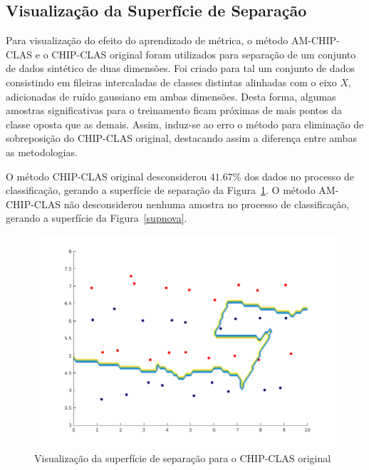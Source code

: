 \documentclass[
	12pt,				%
	openright,			%
	twoside,			%
	a4paper,			%
	english,			%
	spanish,			%
	brazil,				%
	]{abntex2}\usepackage[]{graphicx}\usepackage[]{color}
\begin{document}
\subsection{Visualização da Superfície de Separação}

Para visualização do efeito do aprendizado de métrica, o método AM-CHIP-CLAS e o CHIP-CLAS original foram utilizados para separação de um conjunto de dados sintético de duas dimensões. Foi criado para tal um conjunto de dados consistindo em fileiras intercaladas de classes distintas alinhadas com o eixo $X$, adicionadas de ruído gaussiano em ambas dimensões. Desta forma, algumas amostras significativas para o treinamento ficam próximas de mais pontos da classe oposta que as demais. Assim, induz-se ao erro o método para eliminação de sobreposição do CHIP-CLAS original, destacando assim a diferença entre ambas as metodologias.
\par O método CHIP-CLAS original desconsiderou $41.67\%$ dos dados no processo de classificação, gerando a superfície de separação da Figura~\ref{supvelha}. O método AM-CHIP-CLAS não desconsiderou nenhuma amostra no processo de classificação, gerando a superfície da Figura~\ref{supnova}.

\begin{figure}[ht]
\includegraphics[width=\textwidth]{oldsup}
\caption{Visualização da superfície de separação para o CHIP-CLAS original}
\label{supvelha}
\end{figure}
\end{document}
